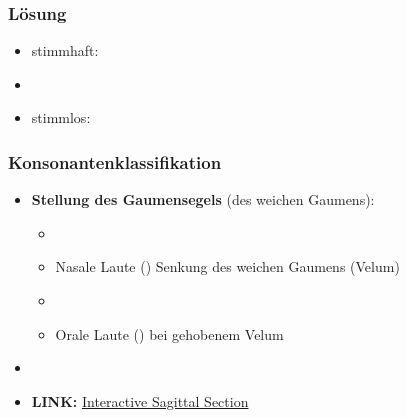
\begin{frame}
\frametitle{Lösung}

\begin{itemize}
\item stimmhaft: \textipa{[ d, z, v, g ]}
\item[]
\item stimmlos: \textipa{[ f, k, P ]}
\end{itemize}
\end{frame}


\begin{frame}
\frametitle{Konsonantenklassifikation}

	\begin{itemize}
		\item \textbf{Stellung des Gaumensegels} (des weichen Gaumens):
		
		\begin{itemize}
			\item[]
			\item Nasale Laute (\zB \textipa{ [ m , n ]}) \ras Senkung des weichen Gaumens (Velum)
			\item[]
			\item Orale Laute (\zB \textipa{ [ f , a ]}) \ras bei gehobenem Velum
		\end{itemize}
		
		\item[]
		\item \textbf{LINK:} \href{http://smu-facweb.smu.ca/~s0949176/sammy/}{Interactive Sagittal Section}
	\end{itemize}
	
\end{frame}



